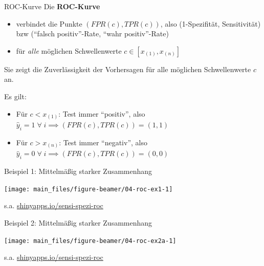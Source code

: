 \documentclass[
  10pt,
  ignorenonframetext,
]{beamer}
\providecommand{\tightlist}{%
  \setlength{\itemsep}{0pt}\setlength{\parskip}{0pt}}
\begin{document}
\begin{frame}{ROC-Kurve}
\label{roc-kurve}
Die \textbf{ROC-Kurve}

\begin{itemize}
\tightlist
\item
  verbindet die Punkte \((FPR(c),TPR(c))\), also (1-Spezifität,
  Sensitivität)\\
  bzw (``falsch positiv''-Rate, ``wahr positiv''-Rate)\\
\item
  für \emph{alle} möglichen Schwellenwerte \(c \in [x_{(1)}, x_{(n)}]\)
\end{itemize}

Sie zeigt die Zuverlässigkeit der Vorhersagen für alle möglichen
Schwellenwerte \(c\) an.

Es gilt:

\begin{itemize}
\tightlist
\item
  Für \(c < x_{(1)}\): Test immer ``positiv'', also\\
  \(\hat y_i = 1\; \forall\; i \implies (FPR(c), TPR(c)) = (1, 1)\)
\item
  Für \(c > x_{(n)}\): Test immer ``negativ'', also\\
  \(\hat y_i = 0\; \forall\; i \implies (FPR(c), TPR(c)) = (0, 0)\)
\end{itemize}

\scriptsize\normalsize
\end{frame}

\begin{frame}{Beispiel 1: Mittelmäßig starker Zusammenhang}
\label{beispiel-1-mittelmuxe4uxdfig-starker-zusammenhang}
\scriptsize

\begin{center}\texttt{[image: main\_files/figure-beamer/04-roc-ex1-1]} \end{center}

\normalsize
\tiny

s.a.
\href{https://fabian-s.shinyapps.io/sensi-spezi-roc/}{shinyapps.io/sensi-spezi-roc}
\end{frame}

\begin{frame}{Beispiel 2: Mittelmäßig starker Zusammenhang}
\label{beispiel-2-mittelmuxe4uxdfig-starker-zusammenhang}
\scriptsize

\begin{center}\texttt{[image: main\_files/figure-beamer/04-roc-ex2a-1]} \end{center}

\normalsize
\tiny

s.a.
\href{https://fabian-s.shinyapps.io/sensi-spezi-roc/}{shinyapps.io/sensi-spezi-roc}
\end{frame}
\end{document}
